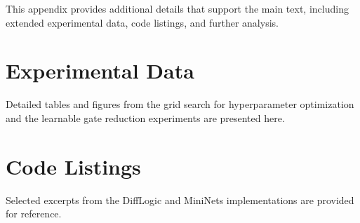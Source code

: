 This appendix provides additional details that support the main text, including extended experimental data, code listings, and further analysis.

\section{Experimental Data}
Detailed tables and figures from the grid search for hyperparameter optimization and the learnable gate reduction experiments are presented here.

\section{Code Listings}
Selected excerpts from the DiffLogic and MiniNets implementations are provided for reference.

